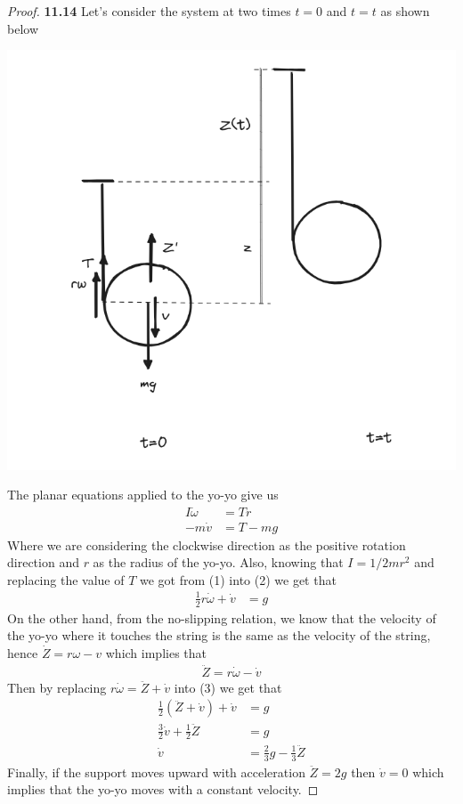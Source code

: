\documentclass[11pt]{article}
\theoremstyle{definition}
\begin{document}
\cleardoublepage
\begin{proof}{\textbf{11.14}}
    Let's consider the system at two times $t=0$ and $t=t$ as shown below 
    \begin{center}
        \includegraphics[scale=0.5]{ch11-14.png}
    \end{center}
    The planar equations applied to the yo-yo give us
    \begin{align}
        I\dot{\omega} &= Tr\\
        -m\dot{v} &= T - mg
    \end{align}
    Where we are considering the clockwise direction as the positive rotation
    direction and $r$ as the radius of the yo-yo.
    Also, knowing that $I = 1/2 m r^2$ and replacing the value of $T$ we got
    from (1) into (2) we get that
    \begin{align}
        \frac{1}{2}r\dot{\omega} +\dot{v} &= g
    \end{align}
    On the other hand, from the no-slipping relation, we know that the velocity
    of the yo-yo where it touches the string is the same as the velocity of the
    string, hence $\dot{Z} =r\omega - v$ which implies that
    \begin{align*}
        \ddot{Z} = r\dot\omega - \dot{v}
    \end{align*}
    Then by replacing $r\dot\omega = \ddot{Z} + \dot v$ into (3) we get that
    \begin{align*}
        \frac{1}{2}(\ddot{Z} + \dot v) + \dot{v}&= g\\
        \frac{3}{2}\dot v + \frac{1}{2}\ddot{Z}&= g\\
        \dot v &= \frac{2}{3}g -\frac{1}{3}\ddot{Z}
    \end{align*}
    Finally, if the support moves upward with acceleration $\ddot Z = 2g$ then
    $\dot v = 0$ which implies that the yo-yo moves with a constant velocity.
\end{proof}
\end{document}
